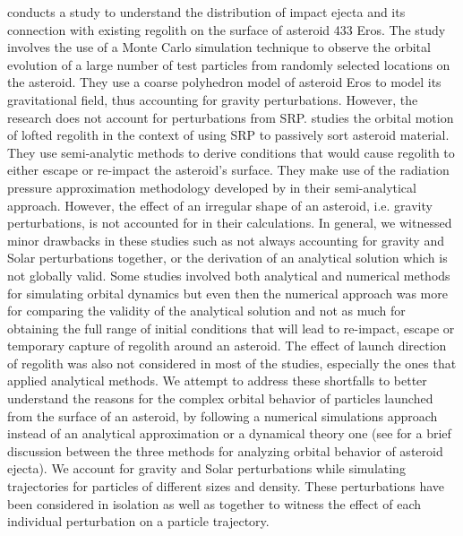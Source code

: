 \FloatBarrier

\cite{korycansky2004_impactEjecta} conducts a study to understand the distribution of impact ejecta and its connection with existing regolith on the surface of asteroid 433 Eros. The study involves the use of a Monte Carlo simulation technique to observe the orbital evolution of a large number of test particles from randomly selected locations on the asteroid. They use a coarse polyhedron model of asteroid Eros to model its gravitational field, thus accounting for gravity perturbations. However, the research does not account for perturbations from \gls{SRP}. \cite{yarnoz2014passive} studies the orbital motion of lofted regolith in the context of using \gls{SRP} to passively sort asteroid material. They use semi-analytic methods to derive conditions that would cause regolith to either escape or re-impact the asteroid’s surface. They make use of the radiation pressure approximation methodology developed by \cite{richter1995stability} in their semi-analytical approach. However, the effect of an irregular shape of an asteroid, i.e. gravity perturbations, is not accounted for in their calculations.
%
\newline\newline
%
In general, we witnessed minor drawbacks in these studies such as not always accounting for gravity and Solar perturbations together, or the derivation of an analytical solution which is not globally valid. Some studies involved both analytical and numerical methods for simulating orbital dynamics but even then the numerical approach was more for comparing the validity of the analytical solution and not as much for obtaining the full range of initial conditions that will lead to re-impact, escape or temporary capture of regolith around an asteroid. The effect of launch direction of regolith was also not considered in most of the studies, especially the ones that applied analytical methods. We attempt to address these shortfalls to better understand the reasons for the complex orbital behavior of particles launched from the surface of an asteroid, by following a numerical simulations approach instead of an analytical approximation or a dynamical theory one (see \cite{scheeres2002fate} for a brief discussion between the three methods for analyzing orbital behavior of asteroid ejecta). We account for gravity and Solar perturbations while simulating trajectories for particles of different sizes and density. These perturbations have been considered in isolation as well as together to witness the effect of each individual perturbation on a particle trajectory.

